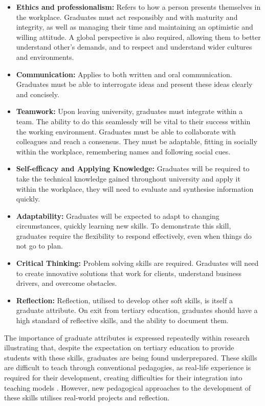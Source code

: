 \documentclass{l4proj}
\begin{document}
\begin{itemize}
    \item \textbf{Ethics and professionalism:} Refers to how a person presents themselves in the workplace. Graduates must act responsibly and with maturity and integrity, as well as managing their time and maintaining an optimistic and willing attitude. A global perspective is also required, allowing them to better understand other’s demands, and to respect and understand wider cultures and environments.
    \item \textbf{Communication:} Applies to both written and oral communication. Graduates must be able to interrogate ideas and present these ideas clearly and concisely.
    \item \textbf{Teamwork:} Upon leaving university, graduates must integrate within a team. The ability to do this seamlessly will be vital to their success within the working environment. Graduates must be able to collaborate with colleagues and reach a consensus. They must be adaptable, fitting in socially within the workplace, remembering names and following social cues.
    \item \textbf{Self-efficacy and Applying Knowledge:} Graduates will be required to take the technical knowledge gained throughout university and apply it within the workplace, they will need to evaluate and synthesise information quickly.
    \item \textbf{Adaptability:} Graduates will be expected to adapt to changing circumstances, quickly learning new skills. To demonstrate this skill, graduates require the flexibility to respond effectively, even when things do not go to plan. 
    \item \textbf{Critical Thinking:} Problem solving skills are required. Graduates will need to create innovative solutions that work for clients, understand business drivers, and overcome obstacles.
    \item \textbf{Reflection:} Reflection, utilised to develop other soft skills, is itself a graduate attribute. On exit from tertiary education, graduates should have a high standard of reflective skills, and the ability to document them.
\end{itemize}

The importance of graduate attributes is expressed repeatedly within research illustrating that, despite the expectation on tertiary education to provide students with these skills, graduates are being found underprepared. These skills are difficult to teach through conventional pedagogies, as real-life experience is required for their development, creating difficulties for their integration into teaching models \citep{barr_2019}. However, new pedagogical approaches to the development of these skills utilises real-world projects and reflection.
 
\end{document}
